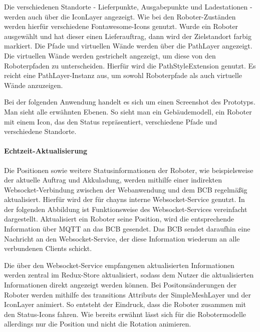Die verschiedenen Standorte - Lieferpunkte, Ausgabepunkte und Ladestationen - werden auch über die IconLayer angezeigt. Wie bei den Roboter-Zuständen werden hierfür verschiedene Fontawesome-Icons genutzt. Wurde ein Roboter ausgewählt und hat dieser einen Lieferauftrag, dann wird der Zielstandort farbig markiert. Die Pfade und virtuellen Wände werden über die PathLayer angezeigt. 
Die virtuellen Wände werden gestrichelt angezeigt, um diese von den Roboterpfaden zu unterscheiden. Hierfür wird die PathStyleExtension genutzt.
Es reicht eine PathLayer-Instanz aus, um sowohl Roboterpfade als auch virtuelle Wände anzuzeigen.

Bei der folgenden Anwendung handelt es sich um einen Screenshot des Prototyps. Man sieht alle erwähnten Ebenen. So sieht man ein Gebäudemodell, ein Roboter mit einem Icon, das den Status repräsentiert, verschiedene Pfade und verschiedene Standorte.

\paragraph{Echtzeit-Aktualisierung}
Die Positionen sowie weitere Statusinformationen der Roboter, wie beispielsweise der aktuelle Auftrag und Akkuladung, werden mithilfe einer indirekten \gls{Websocket}-Verbindung zwischen der Webanwendung und dem \ac{BCB} regelmäßig aktualisiert. Hierfür wird der für chayns interne \gls{Websocket}-Service genutzt. In der folgenden Abbildung ist Funktionsweise des \gls{Websocket}-Services vereinfacht dargestellt. Aktualisiert ein Roboter seine Position, wird die entsprechende Information über \gls{MQTT} an das \ac{BCB} gesendet.
Das \ac{BCB} sendet daraufhin eine Nachricht an den \gls{Websocket}-Service, der diese Information wiederum an alle verbundenen Clients schickt.

Die über den \gls{Websocket}-Service empfangenen aktualisierten Informationen werden zentral im Redux-Store aktualisiert, sodass dem Nutzer die aktualisierten Informationen direkt angezeigt werden können. Bei Positonsänderungen der Roboter werden mithilfe des transitions Attributs der SimpleMeshLayer und der IconLayer animiert. So entsteht der Eindruck, dass die Roboter zusammen mit den Status-Icons fahren. Wie bereits erwähnt lässt sich für die Robotermodelle allerdings nur die Position und nicht die Rotation animieren.

